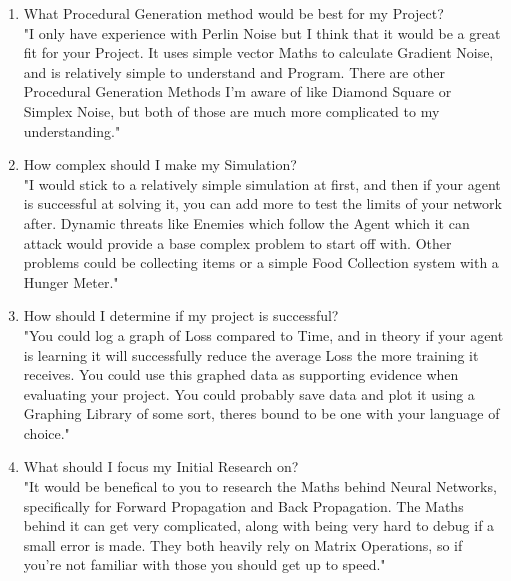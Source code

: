 \begin{flushleft}
\begin{enumerate}
                    \item {\large What Procedural Generation method would be best for my Project?} \\
                    \vspace{0.2cm}
                    "I only have experience with Perlin Noise but I think that it would be a great fit for your Project. It uses simple vector Maths
                    to calculate Gradient Noise, and is relatively simple to understand and Program. There are other Procedural Generation Methods
                    I'm aware of like Diamond Square or Simplex Noise, but both of those are much more complicated to my understanding."

                    \item {\large How complex should I make my Simulation?} \\
                    \vspace{0.2cm}
                    "I would stick to a relatively simple simulation at first, and then if your agent is successful at solving it, you can add more
                    to test the limits of your network after. Dynamic threats like Enemies which follow the Agent which it can attack would provide a base 
                    complex problem to start off with. Other problems could be collecting items or a simple Food Collection system with a Hunger Meter."

                    \item {\large How should I determine if my project is successful?} \\
                    \vspace{0.2cm}
                    "You could log a graph of Loss compared to Time, and in theory if your agent is learning it will successfully reduce the average Loss 
                    the more training it receives. You could use this graphed data as supporting evidence when evaluating your project. You could probably
                    save data and plot it using a Graphing Library of some sort, theres bound to be one with your language of choice."

                    \item {\large What should I focus my Initial Research on?} \\
                    \vspace{0.2cm}
                    "It would be benefical to you to research the Maths behind Neural Networks, specifically for Forward Propagation
                    and Back Propagation. The Maths behind it can get very complicated, along with being very hard to debug if a small error is made.
                    They both heavily rely on Matrix Operations, so if you're not familiar with those you should get up to speed."
                \end{enumerate}

\end{flushleft}
